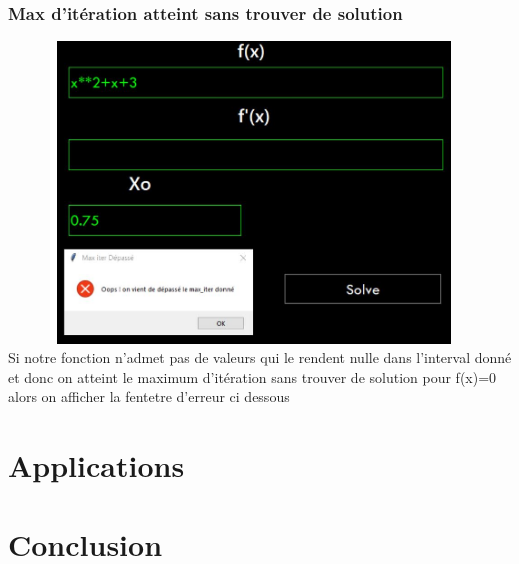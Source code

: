 \documentclass{article}
\begin{document}
\subsubsection{Max d'itération atteint sans trouver de solution}
\includegraphics[width=13cm,height=8cm]{img/validation/err_max.JPG}\\

Si notre fonction n'admet pas de valeurs qui le rendent nulle dans l'interval donné et donc on atteint le maximum d'itération sans trouver de solution pour f(x)=0 alors on afficher la fentetre d'erreur ci dessous


\newpage
\section{Applications}
\newpage
\section{Conclusion}
\end{document}
